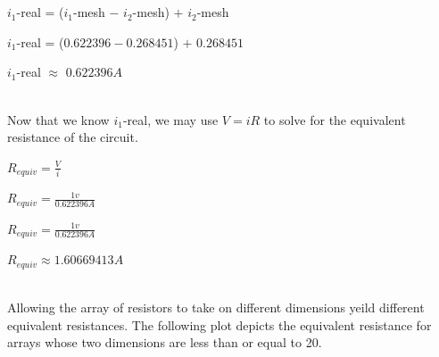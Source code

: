 \documentclass{report}
\begin{document}
\begin{enumerate}
\\
\\
\begin{center}
$\displaystyle i_1$-real = ($i_1$-mesh $-$ $i_2$-mesh) $+$ $i_2$-mesh  
\end{center}
\begin{center}
$\displaystyle i_1$-real = ($0.622396 - 0.268451$) $+$ $0.268451$
\end{center}
\begin{center}
$\displaystyle i_1$-real $\approx$ $0.622396A$
\end{center}

\\Now that we know $i_1$-real, we may use $V=iR$ to solve for the equivalent resistance of the circuit. 
\begin{center}
$\displaystyle R_{equiv}=\frac{V}{i}$
\end{center}
\begin{center}
$\displaystyle R_{equiv}=\frac{1v}{0.622396A}$
\end{center}
\begin{center}
$\displaystyle R_{equiv}=\frac{1v}{0.622396A}$
\end{center}
\begin{center}
$\displaystyle R_{equiv}\approx1.60669413A$
\end{center}
\\Allowing the array of resistors to take on different dimensions yeild different equivalent resistances. The following plot depicts the equivalent resistance for arrays whose two dimensions are less than or equal to 20.


\end{enumerate}
\end{document}
